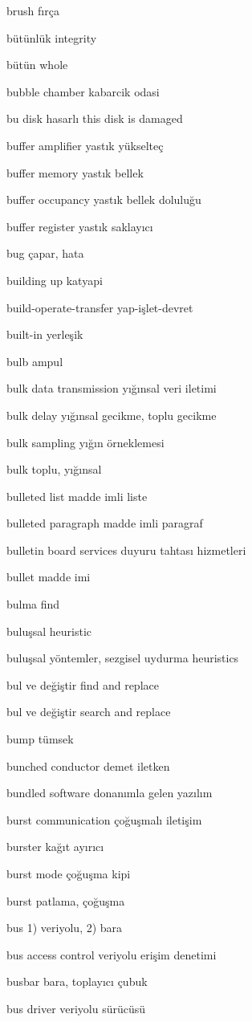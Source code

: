 \documentclass[12pt,fleqn]{article}\usepackage{../../common}
\begin{document}
brush fırça

bütünlük integrity

bütün whole

bubble chamber kabarcik odasi

bu disk hasarlı this disk is damaged

buffer amplifier yastık yükselteç

buffer memory yastık bellek

buffer occupancy yastık bellek doluluğu

buffer register yastık saklayıcı

bug çapar, hata

building up katyapi

build-operate-transfer yap-işlet-devret

built-in yerleşik

bulb ampul

bulk data transmission yığınsal veri iletimi

bulk delay yığınsal gecikme, toplu gecikme

bulk sampling yığın örneklemesi

bulk toplu, yığınsal

bulleted list madde imli liste

bulleted paragraph madde imli paragraf

bulletin board services duyuru tahtası hizmetleri

bullet madde imi

bulma find

buluşsal heuristic

buluşsal yöntemler, sezgisel uydurma heuristics

bul ve değiştir find and replace

bul ve değiştir search and replace

bump tümsek

bunched conductor demet iletken

bundled software donanımla gelen yazılım

burst communication çoğuşmalı iletişim

burster kağıt ayırıcı

burst mode çoğuşma kipi

burst patlama, çoğuşma

bus 1) veriyolu, 2) bara

bus access control veriyolu erişim denetimi

busbar bara, toplayıcı çubuk

bus driver veriyolu sürücüsü
\end{document}

